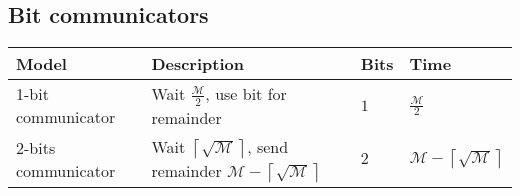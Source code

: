 \subsection{Bit communicators}
\begin{table}[h]
\begin{tabular}{llll}
			\textbf{Model}		& \textbf{Description}						& \textbf{Bits}		& \textbf{Time} \\
	\hline 	1-bit communicator 	& Wait $\frac{\mathcal{M}}{2}$, use bit for remainder
																			& $1$				& $\frac{\mathcal{M}}{2}$ \\
	\hline 	2-bits communicator & Wait $\left \lceil{\sqrt{\mathcal{M}}}\right \rceil$, send remainder $\mathcal{M} -
										\left \lceil{\sqrt{\mathcal{M}}}\right \rceil$			& $2$												
																								& $\mathcal{M} - \left \lceil{\sqrt{\mathcal{M}}}\right \rceil$ \\
\end{tabular}
\end{table}